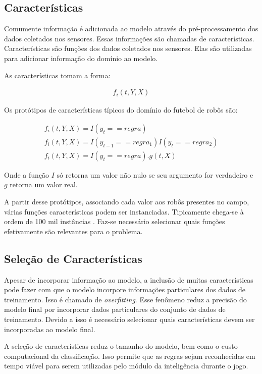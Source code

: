 \subsection{Características}

Comumente informação é adicionada ao modelo através do pré-processamento dos
dados coletados nos sensores. Essas informações são chamadas de características.
Características são funções dos dados coletados nos sensores. Elas são utilizadas
para adicionar informação do domínio ao modelo.

As características tomam a forma:

\begin{gather}
f_i(t,Y,X)
\end{gather}

Os protótipos de características típicos do domínio do futebol de robôs são:

\begin{gather}
f_i(t,Y,X)=I(y_t == regra)\\
f_i(t,Y,X)=I(y_{t-1} == regra_1)I(y_t == regra_2)\\
f_i(t,Y,X)=I(y_t == regra).g(t,X)
\end{gather}

Onde a função $I$ só retorna um valor não nulo se seu argumento for verdadeiro e
$g$ retorna um valor real.

A partir desse protótipos, associando cada valor aos robôs presentes
no campo, várias funções características podem ser instanciadas.
Tipicamente chega-se à ordem de 100 mil instâncias \cite{vail2008crf}. Faz-se necessário
selecionar quais funções efetivamente são relevantes para o problema.

\subsection{Seleção de Características}

Apesar de incorporar informação ao modelo, a inclusão de muitas características
pode fazer com que o modelo incorpore informações particulares dos dados de
treinamento. Isso é chamado de \textit{overfitting}. Esse fenômeno reduz a precisão
do modelo final por incorporar dados particulares do conjunto de dados de
treinamento. Devido a isso é necessário selecionar quais características devem
ser incorporadas ao modelo final.

A seleção de características reduz o tamanho do modelo, bem como o custo
computacional da classificação. Isso permite que as regras sejam reconhecidas
em tempo viável para serem utilizadas pelo módulo da inteligência durante o
jogo.
